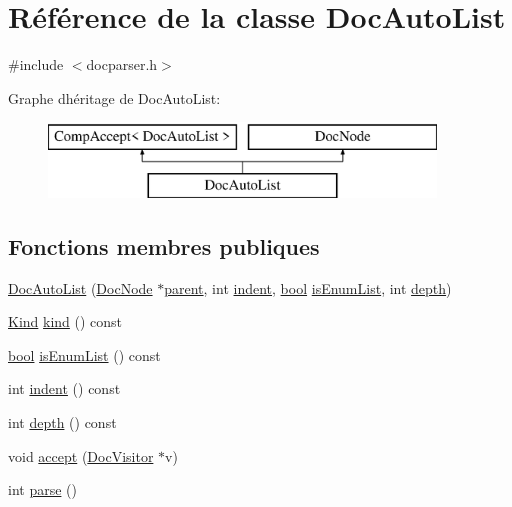\hypertarget{class_doc_auto_list}{}\section{Référence de la classe Doc\+Auto\+List}
\label{class_doc_auto_list}


{\ttfamily \#include $<$docparser.\+h$>$}

Graphe d\textquotesingle{}héritage de Doc\+Auto\+List\+:\begin{figure}[H]
\begin{center}
\leavevmode
\includegraphics[height=2.000000cm]{class_doc_auto_list}
\end{center}
\end{figure}
\subsection*{Fonctions membres publiques}
\begin{DoxyCompactItemize}
\item 
\hyperlink{class_doc_auto_list_a783a7889add7c4cda00ee00c015dff53}{Doc\+Auto\+List} (\hyperlink{class_doc_node}{Doc\+Node} $\ast$\hyperlink{class_doc_node_a990d8b983962776a647e6231d38bd329}{parent}, int \hyperlink{class_doc_auto_list_adae7607dae59771721e16ae63502f56c}{indent}, \hyperlink{qglobal_8h_a1062901a7428fdd9c7f180f5e01ea056}{bool} \hyperlink{class_doc_auto_list_a033852c5e9be4e27f4681fd781612ec8}{is\+Enum\+List}, int \hyperlink{class_doc_auto_list_a132513bfc603eb423c6ef9ff8f8356ee}{depth})
\item 
\hyperlink{class_doc_node_aebd16e89ca590d84cbd40543ea5faadb}{Kind} \hyperlink{class_doc_auto_list_a253f7960bb1755b218e618822e1885dd}{kind} () const 
\item 
\hyperlink{qglobal_8h_a1062901a7428fdd9c7f180f5e01ea056}{bool} \hyperlink{class_doc_auto_list_a033852c5e9be4e27f4681fd781612ec8}{is\+Enum\+List} () const 
\item 
int \hyperlink{class_doc_auto_list_adae7607dae59771721e16ae63502f56c}{indent} () const 
\item 
int \hyperlink{class_doc_auto_list_a132513bfc603eb423c6ef9ff8f8356ee}{depth} () const 
\item 
void \hyperlink{class_doc_auto_list_ad73217f2d93cb92e86455a08fa4f6c7c}{accept} (\hyperlink{class_doc_visitor}{Doc\+Visitor} $\ast$v)
\item 
int \hyperlink{class_doc_auto_list_a8ed0df6d4e379da2f903e00517957e62}{parse} ()
\end{DoxyCompactItemize}
